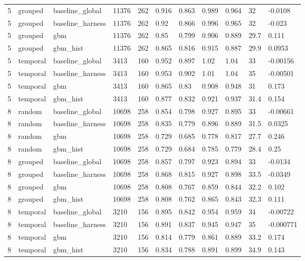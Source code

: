 \begin{tabular}{lllllllllll}
5 & grouped & baseline\_global & 11376 & 262 & 0.916 & 0.863 & 0.989 & 0.964 & 32 & -0.0108 \\
5 & grouped & baseline\_harness & 11376 & 262 & 0.92 & 0.866 & 0.996 & 0.965 & 32 & -0.023 \\
5 & grouped & gbm & 11376 & 262 & 0.85 & 0.799 & 0.906 & 0.889 & 29.7 & 0.111 \\
5 & grouped & gbm\_hist & 11376 & 262 & 0.865 & 0.816 & 0.915 & 0.887 & 29.9 & 0.0953 \\
5 & temporal & baseline\_global & 3413 & 160 & 0.952 & 0.897 & 1.02 & 1.04 & 33 & -0.00156 \\
5 & temporal & baseline\_harness & 3413 & 160 & 0.953 & 0.902 & 1.01 & 1.04 & 35 & -0.00501 \\
5 & temporal & gbm & 3413 & 160 & 0.865 & 0.83 & 0.908 & 0.948 & 31 & 0.173 \\
5 & temporal & gbm\_hist & 3413 & 160 & 0.877 & 0.832 & 0.921 & 0.937 & 31.4 & 0.154 \\
8 & random & baseline\_global & 10698 & 258 & 0.854 & 0.798 & 0.927 & 0.895 & 33 & -0.00661 \\
8 & random & baseline\_harness & 10698 & 258 & 0.835 & 0.779 & 0.896 & 0.889 & 31.5 & 0.0325 \\
8 & random & gbm & 10698 & 258 & 0.729 & 0.685 & 0.778 & 0.817 & 27.7 & 0.246 \\
8 & random & gbm\_hist & 10698 & 258 & 0.729 & 0.684 & 0.785 & 0.779 & 28.4 & 0.25 \\
8 & grouped & baseline\_global & 10698 & 258 & 0.857 & 0.797 & 0.923 & 0.894 & 33 & -0.0134 \\
8 & grouped & baseline\_harness & 10698 & 258 & 0.868 & 0.815 & 0.927 & 0.898 & 33.5 & -0.0349 \\
8 & grouped & gbm & 10698 & 258 & 0.808 & 0.767 & 0.859 & 0.844 & 32.2 & 0.102 \\
8 & grouped & gbm\_hist & 10698 & 258 & 0.808 & 0.762 & 0.865 & 0.843 & 32.3 & 0.111 \\
8 & temporal & baseline\_global & 3210 & 156 & 0.895 & 0.842 & 0.954 & 0.959 & 34 & -0.00722 \\
8 & temporal & baseline\_harness & 3210 & 156 & 0.891 & 0.837 & 0.945 & 0.947 & 35 & -0.000771 \\
8 & temporal & gbm & 3210 & 156 & 0.814 & 0.779 & 0.861 & 0.889 & 33.2 & 0.174 \\
8 & temporal & gbm\_hist & 3210 & 156 & 0.834 & 0.788 & 0.891 & 0.899 & 34.9 & 0.143 \\

\end{tabular}
